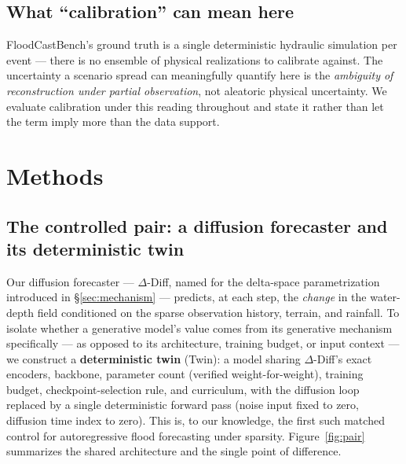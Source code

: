 \documentclass[11pt]{article}
\newcommand{\ours}{\mbox{$\Delta$-Diff}}
\newcommand{\twin}{\mbox{Twin}}
\begin{document}
\subsection{What ``calibration'' can mean here}
\label{sec:calibmeaning}
FloodCastBench's ground truth is a single deterministic hydraulic
simulation per event --- there is no ensemble of physical realizations to
calibrate against. The uncertainty a scenario spread can meaningfully
quantify here is the \emph{ambiguity of reconstruction under partial
observation}, not aleatoric physical uncertainty. We evaluate calibration
under this reading throughout and state it rather than let the term imply
more than the data support.

\section{Methods}
\label{sec:methods}

\subsection{The controlled pair: a diffusion forecaster and its deterministic twin}
\label{sec:twin}
Our diffusion forecaster --- \ours{}, named for the delta-space
parametrization introduced in \S\ref{sec:mechanism} --- predicts, at each
step, the \emph{change} in the water-depth field conditioned on the sparse
observation history, terrain, and rainfall. To isolate whether a
generative model's value comes from its generative mechanism specifically
--- as opposed to its architecture, training budget, or input context ---
we construct a \textbf{deterministic twin} (\twin{}): a model sharing
\ours{}'s exact encoders, backbone, parameter count (verified
weight-for-weight), training budget, checkpoint-selection rule, and
curriculum, with the diffusion loop replaced by a single deterministic
forward pass (noise input fixed to zero, diffusion time index to zero).
This is, to our knowledge, the first such matched control for
autoregressive flood forecasting under sparsity. Figure~\ref{fig:pair}
summarizes the shared architecture and the single point of difference.
\end{document}
